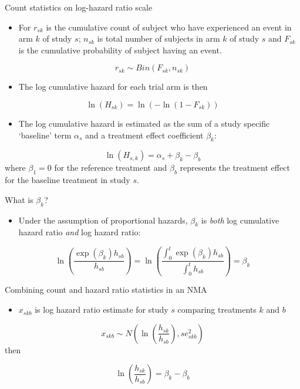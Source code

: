 \documentclass[
  ignorenonframetext,
]{beamer}
\providecommand{\tightlist}{%
  \setlength{\itemsep}{0pt}\setlength{\parskip}{0pt}}\usepackage{longtable,booktabs,array}
\begin{document}
\begin{frame}{Count statistics on log-hazard ratio scale}
\protect\hypertarget{count-statistics-on-log-hazard-ratio-scale}{}
\begin{itemize}
\tightlist
\item
  For \(r_{sk}\) is the cumulative count of subject who have experienced
  an event in arm \(k\) of study \(s\); \(n_{sk}\) is total number of
  subjects in arm \(k\) of study \(s\) and \(F_{sk}\) is the cumulative
  probability of subject having an event.
\end{itemize}

\[
r_{sk} \sim Bin(F_{sk}, n_{sk})
\]

\begin{itemize}
\tightlist
\item
  The log cumulative hazard for each trial arm is then
\end{itemize}

\[
\ln(H_{sk}) = \ln(-\ln(1-F_{sk}))
\]

\begin{itemize}
\tightlist
\item
  The log cumulative hazard is estimated as the sum of a study specific
  `baseline' term \(\alpha_s\) and a treatment effect coefficient
  \(\beta_k\):
\end{itemize}

\[
\ln(H_{s,k}) = \alpha_s + \beta_k - \beta_b
\] where \(\beta_1 = 0\) for the reference treatment and \(\beta_b\)
represents the treatment effect for the baseline treatment in study
\(s\).
\end{frame}

\begin{frame}{What is \(\beta_k\)?}
\protect\hypertarget{what-is-beta_k}{}
\begin{itemize}
\tightlist
\item
  Under the assumption of proportional hazards, \(\beta_k\) is
  \emph{both} log cumulative hazard ratio \emph{and} log hazard ratio:
\end{itemize}

\[
\ln \left( \frac{\exp(\beta_k) h_{sb}}{h_{sb}} \right) = \ln \left( \frac{\int_0^t\exp(\beta_k) h_{sb}}{\int_0^th_{sb}} \right) = \beta_k
\]
\end{frame}

\begin{frame}{Combining count and hazard ratio statistics in an NMA}
\protect\hypertarget{combining-count-and-hazard-ratio-statistics-in-an-nma}{}
\begin{itemize}
\tightlist
\item
  \(x_{skb}\) is log hazard ratio estimate for study \(s\) comparing
  treatments \(k\) and \(b\)
\end{itemize}

\[
x_{skb} \sim N \left( \ln\left( \frac{h_{sk}}{h_{sb}} \right), se^2_{skb} \right)
\] then

\[
\ln\left( \frac{h_{sk}}{h_{sb}} \right) = \beta_k - \beta_b
\]
\end{frame}
\end{document}
